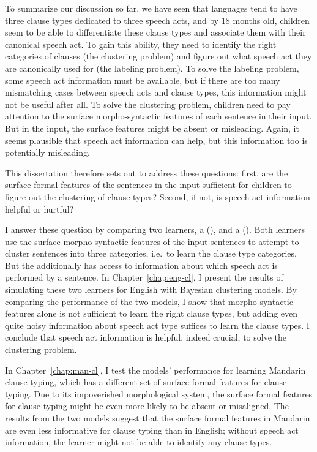 To summarize our discussion so far, we have seen that languages tend to have three clause types dedicated to three speech acts, and by 18 months old, children seem to be able to differentiate these clause types and associate them with their canonical speech act. To gain this ability, they need to identify the right categories of clauses (the clustering problem) and figure out what speech act they are canonically used for (the labeling problem). To solve the labeling problem, some speech act information must be available, but if there are too many mismatching cases between speech acts and clause types, this information might not be useful after all. To solve the clustering problem, children need to pay attention to the surface morpho-syntactic features of each sentence in their input. But in the input, the surface features might be absent or misleading. Again, it seems plausible that speech act information can help, but this information too is potentially misleading.

This dissertation therefore sets out to address these questions: first, are the surface formal features of the sentences in the input sufficient for children to figure out the clustering of clause types? Second, if not, is speech act information helpful or hurtful? 

I answer these question by comparing two learners, a \distlearner{} (\dlearnerabbr{}), and a \praglearner{} (\plearnerabbr{}). Both learners use the surface morpho-syntactic features of the input sentences to attempt to cluster sentences into three categories, i.e.\ to learn the clause type categories. But the \plearnerabbr{} additionally has access to information about which speech act is performed by a sentence. In Chapter~\ref{chap:eng-cl}, I present the results of simulating these two learners for English with Bayesian clustering models. By comparing the performance of the two models, I show that morpho-syntactic features alone is not sufficient to learn the right clause types, but adding even quite noisy information about speech act type suffices to learn the clause types. I conclude that speech act information is helpful, indeed crucial, to solve the clustering problem.

In Chapter~\ref{chap:man-cl}, I test the models' performance for learning Mandarin clause typing, which has a different set of surface formal features for clause typing. Due to its impoverished morphological system, the surface formal features for clause typing might be even more likely to be absent or misaligned. The results from the two models suggest that the surface formal features in Mandarin are even less informative for clause typing than in English; without speech act information, the learner might not be able to identify any clause types.  

